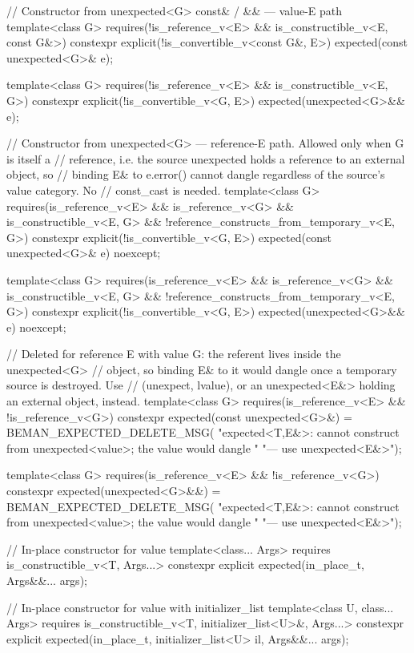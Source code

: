 \begin{codeblock}
{{    // Constructor from unexpected<G> const& / && — value-E path
    template<class G>
      requires(!is_reference_v<E> && is_constructible_v<E, const G&>)
    constexpr explicit(!is_convertible_v<const G&, E>) expected(const unexpected<G>& e);

    template<class G>
      requires(!is_reference_v<E> && is_constructible_v<E, G>)
    constexpr explicit(!is_convertible_v<G, E>) expected(unexpected<G>&& e);

    // Constructor from unexpected<G> — reference-E path. Allowed only when G is itself a
    // reference, i.e. the source unexpected holds a reference to an external object, so
    // binding E& to e.error() cannot dangle regardless of the source's value category. No
    // const_cast is needed.
    template<class G>
      requires(is_reference_v<E> && is_reference_v<G> && is_constructible_v<E, G> &&
               !reference_constructs_from_temporary_v<E, G>)
    constexpr explicit(!is_convertible_v<G, E>) expected(const unexpected<G>& e) noexcept;

    template<class G>
      requires(is_reference_v<E> && is_reference_v<G> && is_constructible_v<E, G> &&
               !reference_constructs_from_temporary_v<E, G>)
    constexpr explicit(!is_convertible_v<G, E>) expected(unexpected<G>&& e) noexcept;

    // Deleted for reference E with value G: the referent lives inside the unexpected<G>
    // object, so binding E& to it would dangle once a temporary source is destroyed. Use
    // (unexpect, lvalue), or an unexpected<E&> holding an external object, instead.
    template<class G>
      requires(is_reference_v<E> && !is_reference_v<G>)
    constexpr expected(const unexpected<G>&) = BEMAN_EXPECTED_DELETE_MSG(
        "expected<T,E&>: cannot construct from unexpected<value>; the value would dangle "
        "— use unexpected<E&>");

    template<class G>
      requires(is_reference_v<E> && !is_reference_v<G>)
    constexpr expected(unexpected<G>&&) = BEMAN_EXPECTED_DELETE_MSG(
        "expected<T,E&>: cannot construct from unexpected<value>; the value would dangle "
        "— use unexpected<E&>");

    // In-place constructor for value
    template<class... Args>
      requires is_constructible_v<T, Args...>
    constexpr explicit expected(in_place_t, Args&&... args);

    // In-place constructor for value with initializer_list
    template<class U, class... Args>
      requires is_constructible_v<T, initializer_list<U>&, Args...>
    constexpr explicit expected(in_place_t, initializer_list<U> il, Args&&... args);

}}
\end{codeblock}
